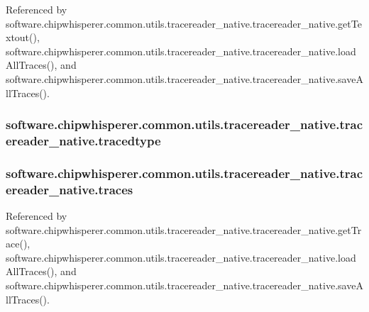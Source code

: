 Referenced by software.\+chipwhisperer.\+common.\+utils.\+tracereader\+\_\+native.\+tracereader\+\_\+native.\+get\+Textout(), software.\+chipwhisperer.\+common.\+utils.\+tracereader\+\_\+native.\+tracereader\+\_\+native.\+load\+All\+Traces(), and software.\+chipwhisperer.\+common.\+utils.\+tracereader\+\_\+native.\+tracereader\+\_\+native.\+save\+All\+Traces().

\hypertarget{classsoftware_1_1chipwhisperer_1_1common_1_1utils_1_1tracereader__native_1_1tracereader__native_a9431f4ec449af7291a8fe7af0057b37d}{}
\subsubsection[{tracedtype}]{\setlength{\rightskip}{0pt plus 5cm}software.\+chipwhisperer.\+common.\+utils.\+tracereader\+\_\+native.\+tracereader\+\_\+native.\+tracedtype}\label{classsoftware_1_1chipwhisperer_1_1common_1_1utils_1_1tracereader__native_1_1tracereader__native_a9431f4ec449af7291a8fe7af0057b37d}
\hypertarget{classsoftware_1_1chipwhisperer_1_1common_1_1utils_1_1tracereader__native_1_1tracereader__native_ae8cd3e2e771634968def7b51309d1971}{}
\subsubsection[{traces}]{\setlength{\rightskip}{0pt plus 5cm}software.\+chipwhisperer.\+common.\+utils.\+tracereader\+\_\+native.\+tracereader\+\_\+native.\+traces}\label{classsoftware_1_1chipwhisperer_1_1common_1_1utils_1_1tracereader__native_1_1tracereader__native_ae8cd3e2e771634968def7b51309d1971}


Referenced by software.\+chipwhisperer.\+common.\+utils.\+tracereader\+\_\+native.\+tracereader\+\_\+native.\+get\+Trace(), software.\+chipwhisperer.\+common.\+utils.\+tracereader\+\_\+native.\+tracereader\+\_\+native.\+load\+All\+Traces(), and software.\+chipwhisperer.\+common.\+utils.\+tracereader\+\_\+native.\+tracereader\+\_\+native.\+save\+All\+Traces().

